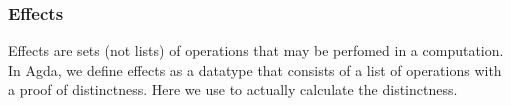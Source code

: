 \documentclass[a4paper,11pt]{article}
\newcommand\data[1]{{\AgdaFunction{#1}}}
\newcommand\field[1]{{\AgdaField{#1}}}
\begin{document}
\subsubsection{Effects}

Effects are sets (not lists) of operations that may be perfomed in a computation.
In Agda, we define effects as a datatype \data{Eff} that consists of a list of operations with a proof of distinctness. Here we use \field{decEq} to actually calculate the distinctness.

\begin{code}%
%
\>[2]\AgdaSpace{}%
\AgdaSpace{}%
\AgdaSymbol{:}\AgdaSpace{}%
\<%
\\
%
\>[2]\AgdaSpace{}%
\AgdaSymbol{:}\AgdaSpace{}%
\AgdaSpace{}%
\AgdaSpace{}%
\AgdaSpace{}%
\AgdaSpace{}%
\<%
\\
%
\\[\AgdaEmptyExtraSkip]%
%
\>[2]\AgdaSpace{}%
\AgdaSpace{}%
\<%
\\
\>[2][@{}l@{\AgdaIndent{0}}]%
\>[4]\AgdaSpace{}%
\AgdaSymbol{:}\AgdaSpace{}%
\<%
\\
%
\>[4]\AgdaSpace{}%
\AgdaSymbol{:}\AgdaSpace{}%
\AgdaSymbol{(}\AgdaSpace{}%
\AgdaSymbol{:}\AgdaSpace{}%
\AgdaSymbol{)}\AgdaSpace{}%
\AgdaSymbol{(}\AgdaSpace{}%
\AgdaSymbol{:}\AgdaSpace{}%
\AgdaSymbol{)}\AgdaSpace{}%
\AgdaSpace{}%
\AgdaSpace{}%
\AgdaSpace{}%
\AgdaSpace{}%
\AgdaSpace{}%
\<%
\\
%
\\[\AgdaEmptyExtraSkip]%
%
\>[2]\AgdaSpace{}%
\AgdaOperator{\AgdaInductiveConstructor{\AgdaUnderscore{},\#\AgdaUnderscore{}}}\AgdaSpace{}%
\AgdaSpace{}%
\AgdaSpace{}%
\AgdaSymbol{=}\AgdaSpace{}%
\AgdaSpace{}%
\AgdaSpace{}%
\AgdaSpace{}%
\AgdaSymbol{\AgdaUnderscore{}}\<%
\\
%
\\[\AgdaEmptyExtraSkip]%
%
\>[2]\AgdaSpace{}%
\AgdaSpace{}%
\AgdaSpace{}%
\AgdaSymbol{=}\AgdaSpace{}%
\<%
\\
%
\>[2]\AgdaSpace{}%
\AgdaSpace{}%
\AgdaSymbol{(}\AgdaSpace{}%
\AgdaOperator{\AgdaInductiveConstructor{,\#}}\AgdaSpace{}%
\AgdaSymbol{)}\AgdaSpace{}%
\AgdaSymbol{=}\AgdaSpace{}%
\AgdaSpace{}%
\AgdaSymbol{(}\AgdaSpace{}%
\AgdaSymbol{(}\AgdaSpace{}%
\AgdaSpace{}%
\AgdaSymbol{))}\AgdaSpace{}%
\AgdaSpace{}%
\AgdaSpace{}%
\AgdaSpace{}%
\<%
\end{code}
\end{document}
